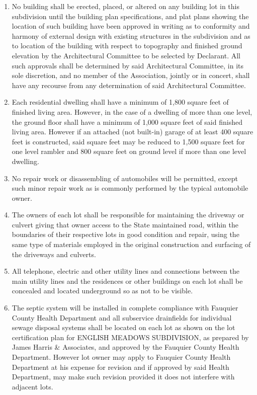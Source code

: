 \documentclass[12pt, letterpaper]{article}
\begin{document}
\begin{enumerate}
\item No building shall be erected, placed, or altered on any building lot in this subdivision until the building plan specifications, and plat plans showing the location of such building have been approved in writing as to conformity and harmony of external design with existing structures in the subdivision and as to location of the building with respect to topography and finished ground elevation by the Architectural Committee to be selected by Declarant.
All such approvals shall be determined by said Architectural Committee, in its sole discretion, and no member of the Association, jointly or in concert, shall have any recourse from any determination of said Architectural Committee.
\item Each residential dwelling shall have a minimum of 1,800 square feet of finished living area.
However, in the case of a dwelling of more than one level, the ground floor shall have a minimum of 1,000 square feet of said finished living area.
However if an attached (not built-in) garage of at least 400 square feet is constructed, said square feet may be reduced to 1,500 square feet for one level rambler and 800 square feet on ground level if more than one level dwelling.
\item No repair work or disassembling of automobiles will be permitted, except such minor repair work as is commonly performed by the typical automobile owner.
\item The owners of each lot shall be responsible for maintaining the driveway or culvert giving that owner access to the State maintained road, within the boundaries of their respective lots in good condition and repair, using the same type of materials employed in the original construction and surfacing of the driveways and culverts.
\item All telephone, electric and other utility lines and connections between the main utility lines and the residences or other buildings on each lot shall be concealed and located underground so as not to be visible.
\item The septic system will be installed in complete compliance with Fauquier County Health Department and all subservice drainfields for individual sewage disposal systems shall be located on each lot as shown on the lot certification plan for ENGLISH MEADOWS SUBDIVISION, as prepared by James Harris \& Associates, and approved by the Fauquier County Health Department.
However lot owner may apply to Fauquier County Health Department at his expense for revision and if approved by said Health Department, may make such revision provided it does not interfere with adjacent lots.
\end{enumerate}
\end{document}
